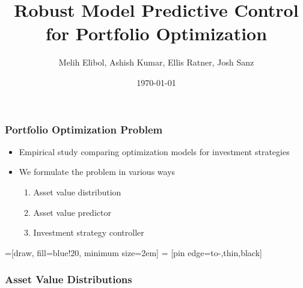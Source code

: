 \documentclass{beamer}
\title[Robust MPC for Portfolio Optimization]{Robust Model Predictive Control for Portfolio Optimization} %
\author[M. Elibol, A. Kumar, E. Ratner, J. Sanz]{Melih Elibol, Ashish Kumar, Ellis Ratner, Josh Sanz} %
\institute[] %
{
\medskip
}
\date{\today} %
\begin{document}
\begin{frame}
\titlepage %
\end{frame}

\begin{frame}
\frametitle{Portfolio Optimization Problem}

    \begin{itemize}
    \item Empirical study comparing optimization models for investment strategies
    \item We formulate the problem in various ways
        \begin{enumerate}
        \item Asset value distribution

        \item Asset value predictor

        \item Investment strategy controller
        \end{enumerate}
    \end{itemize}

    =[draw, fill=blue!20, minimum size=2em]
 = [pin edge={to-,thin,black}]

\begin{figure}
\centering
{}
\end{figure}

\end{frame}

\begin{frame}
\frametitle{Asset Value Distributions}


\end{frame}
\end{document}

